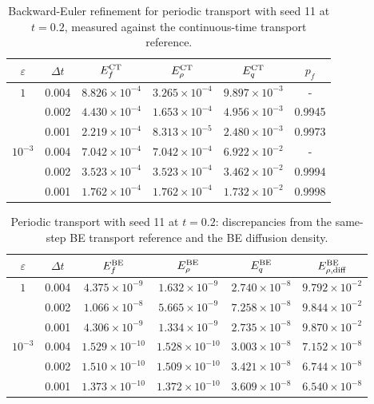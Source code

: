 \begin{table}[!htb]
\centering\small
\setlength{\tabcolsep}{4.5pt}
\caption{Backward-Euler refinement for periodic transport with seed 11 at $t=0.2$, measured against the continuous-time transport reference.}
\label{tab:time-refinement}
\begin{tabular}{cccccc}
\toprule
$\varepsilon$ & $\Delta t$ & $E_f^{\rm CT}$ & $E_\rho^{\rm CT}$ & $E_q^{\rm CT}$ & $p_f$\\
\midrule
$1$ & 0.004 & $8.826\times10^{-4}$ & $3.265\times10^{-4}$ & $9.897\times10^{-3}$ & -\\
 & 0.002 & $4.430\times10^{-4}$ & $1.653\times10^{-4}$ & $4.956\times10^{-3}$ & 0.9945\\
 & 0.001 & $2.219\times10^{-4}$ & $8.313\times10^{-5}$ & $2.480\times10^{-3}$ & 0.9973\\
\addlinespace
$10^{-3}$ & 0.004 & $7.042\times10^{-4}$ & $7.042\times10^{-4}$ & $6.922\times10^{-2}$ & -\\
 & 0.002 & $3.523\times10^{-4}$ & $3.523\times10^{-4}$ & $3.462\times10^{-2}$ & 0.9994\\
 & 0.001 & $1.762\times10^{-4}$ & $1.762\times10^{-4}$ & $1.732\times10^{-2}$ & 0.9998\\
\bottomrule
\end{tabular}
\end{table}

\begin{table}[!htb]
\centering\small
\setlength{\tabcolsep}{4.5pt}
\caption{Periodic transport with seed 11 at $t=0.2$: discrepancies from the same-step BE transport reference and the BE diffusion density.}
\label{tab:be-refinement}
\begin{tabular}{cccccc}
\toprule
$\varepsilon$ & $\Delta t$ & $E_f^{\rm BE}$ & $E_\rho^{\rm BE}$ & $E_q^{\rm BE}$ & $E_{\rho,\mathrm{diff}}^{\rm BE}$\\
\midrule
$1$ & 0.004 & $4.375\times10^{-9}$ & $1.632\times10^{-9}$ & $2.740\times10^{-8}$ & $9.792\times10^{-2}$\\
 & 0.002 & $1.066\times10^{-8}$ & $5.665\times10^{-9}$ & $7.258\times10^{-8}$ & $9.844\times10^{-2}$\\
 & 0.001 & $4.306\times10^{-9}$ & $1.334\times10^{-9}$ & $2.735\times10^{-8}$ & $9.870\times10^{-2}$\\
\addlinespace
$10^{-3}$ & 0.004 & $1.529\times10^{-10}$ & $1.528\times10^{-10}$ & $3.003\times10^{-8}$ & $7.152\times10^{-8}$\\
 & 0.002 & $1.510\times10^{-10}$ & $1.509\times10^{-10}$ & $3.421\times10^{-8}$ & $6.744\times10^{-8}$\\
 & 0.001 & $1.373\times10^{-10}$ & $1.372\times10^{-10}$ & $3.609\times10^{-8}$ & $6.540\times10^{-8}$\\
\bottomrule
\end{tabular}
\end{table}

